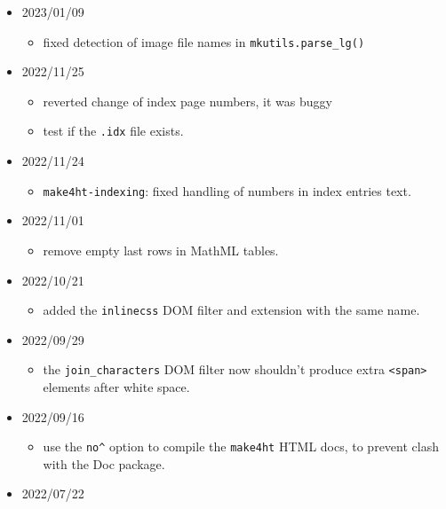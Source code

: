 \begin{itemize}
  \begin{itemize}
  \tightlist
  \item
    version \texttt{0.3k} released.
  \end{itemize}
\item
  2023/01/09

  \begin{itemize}
  \tightlist
  \item
    fixed detection of image file names in \texttt{mkutils.parse\_lg()}
  \end{itemize}
\item
  2022/11/25

  \begin{itemize}
  \tightlist
  \item
    reverted change of index page numbers, it was buggy
  \item
    test if the \texttt{.idx} file exists.
  \end{itemize}
\item
  2022/11/24

  \begin{itemize}
  \tightlist
  \item
    \texttt{make4ht-indexing}: fixed handling of numbers in index
    entries text.
  \end{itemize}
\item
  2022/11/01

  \begin{itemize}
  \tightlist
  \item
    remove empty last rows in MathML tables.
  \end{itemize}
\item
  2022/10/21

  \begin{itemize}
  \tightlist
  \item
    added the \texttt{inlinecss} DOM filter and extension with the same
    name.
  \end{itemize}
\item
  2022/09/29

  \begin{itemize}
  \tightlist
  \item
    the \texttt{join\_characters} DOM filter now shouldn't produce extra
    \texttt{\textless{}span\textgreater{}} elements after white space.
  \end{itemize}
\item
  2022/09/16

  \begin{itemize}
  \tightlist
  \item
    use the \texttt{no\^{}} option to compile the \texttt{make4ht} HTML
    docs, to prevent clash with the Doc package.
  \end{itemize}
\item
  2022/07/22


\end{itemize}
